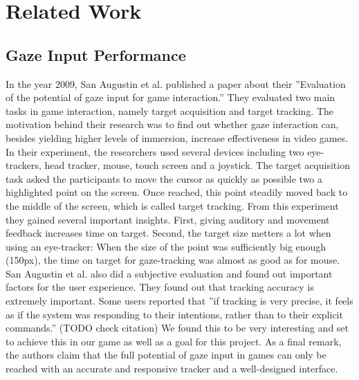 \documentclass{sigchi}
\begin{document}
\section{Related Work}
\subsection{Gaze Input Performance}
In the year 2009, San Augustin et al. published a paper about their ''Evaluation of the potential of gaze input for game interaction.'' \cite{san2009evaluation} They evaluated two main tasks in game interaction, namely target acquisition and target tracking. The motivation behind their research was to find out whether gaze interaction can, besides yielding higher levels of immersion, increase effectiveness in video games. In their experiment, the researchers used several devices including two eye-trackers, head tracker, mouse, touch screen and a joystick. The target acquisition task asked the participants to move the cursor as quickly as possible two a highlighted point on the screen. Once reached, this point steadily moved back to the middle of the screen, which is called target tracking. From this experiment they gained several important insights. First, giving auditory and movement feedback increases time on target. Second, the target size metters a lot when using an eye-tracker: When the size of the point was sufficiently big enough (150px), the time on target for gaze-tracking was almost as good as for mouse.\\
San Augustin et al. also did a subjective evaluation and found out important factors for the user experience. They found out that tracking accuracy is extremely important. Some users reported that ''if tracking is very precise, it feels as if the system was responding to their intentions, rather than to their explicit commands.''\cite{san2009evaluation} (TODO check citation) We found this to be very interesting and set to achieve this in our game as well as a goal for this project. As a final remark, the authors claim that the full potential of gaze input in games can only be reached with an accurate and responsive tracker and a well-designed interface.
\end{document}
